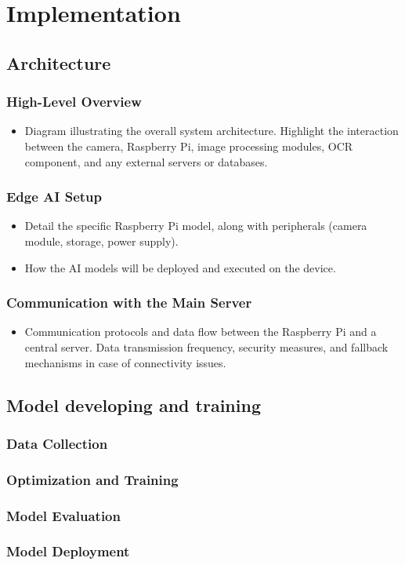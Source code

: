 \chapter{Implementation}
\label{chapter:implementation}


\section{Architecture}

\subsection{High-Level Overview}

\begin{itemize}
    \item Diagram illustrating the overall system architecture. Highlight the interaction between the camera,
    Raspberry Pi, image processing modules, OCR component, and any external servers or databases.
\end{itemize}

\subsection{Edge AI Setup}

\begin{itemize}
    \item Detail the specific Raspberry Pi model, along with peripherals (camera module, storage, power
    supply).
    \item How the AI models will be deployed and executed on the device.
\end{itemize}

\subsection{Communication with the Main Server}
\begin{itemize}
    \item Communication protocols and data flow between the Raspberry Pi and a central server.
    Data transmission frequency, security measures, and fallback mechanisms in case of connectivity issues.
\end{itemize}


\section{Model developing and training}

\subsection{Data Collection}

\subsection{Optimization and Training}

\subsection{Model Evaluation}

\subsection{Model Deployment}